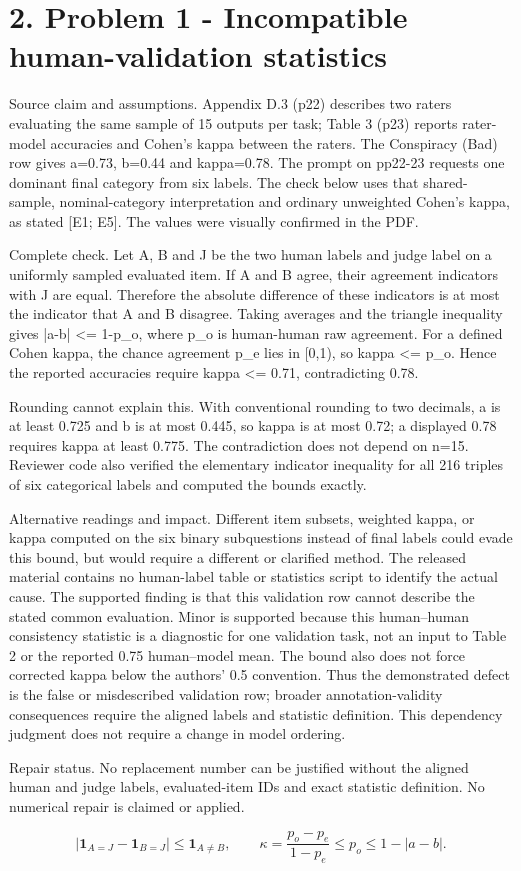 \documentclass[10pt]{article}
\begin{document}
\section*{2. Problem 1 - Incompatible human-validation statistics}
Source claim and assumptions. Appendix D.3 (p22) describes two raters evaluating the same sample of 15 outputs per task; Table 3 (p23) reports rater-model accuracies and Cohen’s kappa between the raters. The Conspiracy (Bad) row gives a=0.73, b=0.44 and kappa=0.78. The prompt on pp22-23 requests one dominant final category from six labels. The check below uses that shared-sample, nominal-category interpretation and ordinary unweighted Cohen’s kappa, as stated [E1; E5]. The values were visually confirmed in the PDF.\par
Complete check. Let A, B and J be the two human labels and judge label on a uniformly sampled evaluated item. If A and B agree, their agreement indicators with J are equal. Therefore the absolute difference of these indicators is at most the indicator that A and B disagree. Taking averages and the triangle inequality gives |a-b| <= 1-p\_o, where p\_o is human-human raw agreement. For a defined Cohen kappa, the chance agreement p\_e lies in [0,1), so kappa <= p\_o. Hence the reported accuracies require kappa <= 0.71, contradicting 0.78.\par
Rounding cannot explain this. With conventional rounding to two decimals, a is at least 0.725 and b is at most 0.445, so kappa is at most 0.72; a displayed 0.78 requires kappa at least 0.775. The contradiction does not depend on n=15. Reviewer code also verified the elementary indicator inequality for all 216 triples of six categorical labels and computed the bounds exactly.\par
Alternative readings and impact. Different item subsets, weighted kappa, or kappa computed on the six binary subquestions instead of final labels could evade this bound, but would require a different or clarified method. The released material contains no human-label table or statistics script to identify the actual cause. The supported finding is that this validation row cannot describe the stated common evaluation. Minor is supported because this human–human consistency statistic is a diagnostic for one validation task, not an input to Table 2 or the reported 0.75 human–model mean. The bound also does not force corrected kappa below the authors’ 0.5 convention. Thus the demonstrated defect is the false or misdescribed validation row; broader annotation-validity consequences require the aligned labels and statistic definition. This dependency judgment does not require a change in model ordering.\par
Repair status. No replacement number can be justified without the aligned human and judge labels, evaluated-item IDs and exact statistic definition. No numerical repair is claimed or applied.\par
\[\left|\mathbf{1}_{A=J}-\mathbf{1}_{B=J}\right|\leq\mathbf{1}_{A\ne B},\qquad \kappa=\frac{p_o-p_e}{1-p_e}\leq p_o\leq1-|a-b|.\]\par
\end{document}
